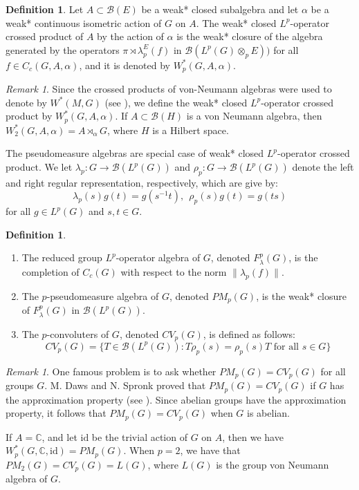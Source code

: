 \documentclass[reqno,11pt]{amsart}
\theoremstyle{plain}
\theoremstyle{definition}
\newtheorem{defn}[thm]{Definition}
\theoremstyle{remark}
\newtheorem{rmk}[thm]{Remark}
\newcommand{\B}{\mathcal{B}}
\begin{document}
\begin{defn}
Let $A\subset \B(E)$ be a weak* closed subalgebra and let $\alpha$ be a weak* continuous isometric action of $G$ on $A$. The weak* closed $L^p$-operator crossed product of $A$ by the action of $\alpha$ is the weak* closure of the algebra generated by the operators $\pi\rtimes\lambda_p^E(f)$ in $\mathcal{B}(L^p(G)\otimes_p E))$ for all $f\in C_c(G,A,\alpha)$, and it is denoted by $W^*_p(G,A,\alpha)$.
\end{defn}

\begin{rmk}
Since the crossed products of von-Neumann algebras were used to denote by $W^*(M,G)$ (see \cite{van}), we define the weak* closed $L^p$-operator crossed product by $W^*_p(G,A,\alpha)$. If $A\subset\mathcal{B}(H)$ is a von Neumann algebra, then $W^*_2(G,A,\alpha)=A\rtimes_\alpha G$, where $H$ is a Hilbert space.
\end{rmk}

The pseudomeasure algebras are special case of weak* closed $L^p$-operator crossed product.
We let $\lambda_p:G\rightarrow \mathcal{B}(L^p(G))$ and $\rho_p:G\rightarrow \mathcal{B}(L^p(G))$ denote the  left and right regular representation, respectively, which are give by:
$$\lambda_p(s)g(t)=g(s^{-1}t),~~\rho_p(s)g(t)=g(ts)$$
for all $g\in L^p(G)$ and $s,t\in G$.

\begin{defn}
\begin{enumerate}
\item[(i)] The reduced group $L^p$-operator algebra of $G$, denoted $F^p_\lambda(G)$, is the completion of $C_c(G)$ with respect to the norm $\|\lambda_p(f)\|.$
\item[(i)] The $p$-pseudomeasure algebra of $G$, denoted $PM_p(G)$, is the weak* closure of $F^p_\lambda(G)$ in $\mathcal{B}(L^p(G))$.
\item[(ii)] The $p$-convoluters of $G$, denoted $CV_p(G)$, is defined as follows: $$CV_p(G)=\{T\in \mathcal{B}(L^p(G)):T\rho_p(s)=\rho_p(s)T \text{ for all } s\in G\}$$
\end{enumerate}
\end{defn}
\begin{rmk}
One famous problem is to ask whether $PM_p(G)=CV_p(G)$ for all groups $G$. M. Daws and N. Spronk proved that $PM_p(G)=CV_p(G)$ if $G$ has the approximation property (see \cite[Theorem 1.1]{Daws}). Since abelian groups have the approximation property, it follows that  $PM_p(G)=CV_p(G)$ when  $G$ is abelian.
\end{rmk}
If $A=\mathbb{C}$, and let $\mathrm{id}$ be the trivial action of $G$ on $A$, then we have $W^*_p(G,\mathbb{C},\mathrm{id})=PM_p(G)$.
When $p=2$, we have that $PM_2(G)=CV_p(G)=L(G)$, where $L(G)$ is the group von Neumann algebra of $G$.
\end{document}
